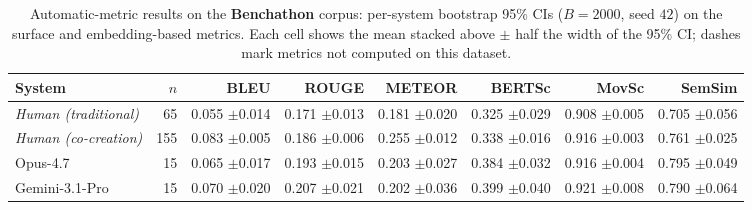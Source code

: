 \begin{table}[t]
\centering\footnotesize
\caption{Automatic-metric results on the \textbf{Benchathon} corpus: per-system bootstrap 95\% CIs ($B=2000$, seed $42$) on the surface and embedding-based metrics. Each cell shows the mean stacked above $\pm$ half the width of the 95\% CI; dashes mark metrics not computed on this dataset.}
\label{tbl-full-results-auto-benchathon}
\setlength{\tabcolsep}{4pt}
\begin{tabular*}{\textwidth}{@{\extracolsep{\fill}}lrrrrrrr@{}}
\toprule
System & $n$ & BLEU & ROUGE & METEOR & BERTSc & MovSc & SemSim \\
\midrule
\textit{Human (traditional)} & 65 & \shortstack[r]{0.055\\{\scriptsize $\pm$0.014}} & \shortstack[r]{0.171\\{\scriptsize $\pm$0.013}} & \shortstack[r]{0.181\\{\scriptsize $\pm$0.020}} & \shortstack[r]{0.325\\{\scriptsize $\pm$0.029}} & \shortstack[r]{0.908\\{\scriptsize $\pm$0.005}} & \shortstack[r]{0.705\\{\scriptsize $\pm$0.056}} \\
\textit{Human (co-creation)} & 155 & \shortstack[r]{0.083\\{\scriptsize $\pm$0.005}} & \shortstack[r]{0.186\\{\scriptsize $\pm$0.006}} & \shortstack[r]{0.255\\{\scriptsize $\pm$0.012}} & \shortstack[r]{0.338\\{\scriptsize $\pm$0.016}} & \shortstack[r]{0.916\\{\scriptsize $\pm$0.003}} & \shortstack[r]{0.761\\{\scriptsize $\pm$0.025}} \\
Opus-4.7 & 15 & \shortstack[r]{0.065\\{\scriptsize $\pm$0.017}} & \shortstack[r]{0.193\\{\scriptsize $\pm$0.015}} & \shortstack[r]{0.203\\{\scriptsize $\pm$0.027}} & \shortstack[r]{0.384\\{\scriptsize $\pm$0.032}} & \shortstack[r]{0.916\\{\scriptsize $\pm$0.004}} & \shortstack[r]{0.795\\{\scriptsize $\pm$0.049}} \\
Gemini-3.1-Pro & 15 & \shortstack[r]{0.070\\{\scriptsize $\pm$0.020}} & \shortstack[r]{0.207\\{\scriptsize $\pm$0.021}} & \shortstack[r]{0.202\\{\scriptsize $\pm$0.036}} & \shortstack[r]{0.399\\{\scriptsize $\pm$0.040}} & \shortstack[r]{0.921\\{\scriptsize $\pm$0.008}} & \shortstack[r]{0.790\\{\scriptsize $\pm$0.064}} \\

\end{tabular*}
\end{table}

